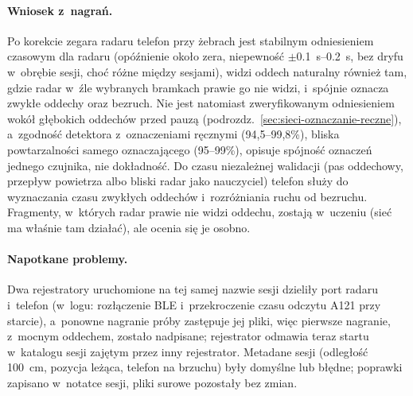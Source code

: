\documentclass[12pt,a4paper,oneside]{report}
\begin{document}
\paragraph{Wniosek z~nagrań.} Po korekcie zegara radaru telefon przy żebrach jest stabilnym odniesieniem
czasowym dla radaru (opóźnienie około zera, niepewność $\pm$\SI{0.1}{s}--\SI{0.2}{s}, bez dryfu w~obrębie
sesji, choć różne między sesjami), widzi oddech naturalny również tam, gdzie radar w~źle wybranych bramkach prawie go nie widzi,
i~spójnie oznacza zwykłe oddechy oraz bezruch. Nie jest natomiast zweryfikowanym odniesieniem wokół głębokich
oddechów przed pauzą (podrozdz.~\ref{sec:sieci-oznaczanie-reczne}), a~zgodność detektora z~oznaczeniami
ręcznymi (94,5--99,8\%), bliska powtarzalności samego oznaczającego (95--99\%), opisuje spójność oznaczeń jednego
czujnika, nie dokładność. Do czasu niezależnej
walidacji (pas oddechowy, przepływ powietrza albo bliski radar jako nauczyciel) telefon służy do wyznaczania
czasu zwykłych oddechów i~rozróżniania ruchu od bezruchu. Fragmenty, w~których radar prawie nie widzi oddechu,
zostają w~uczeniu (sieć ma właśnie tam działać), ale ocenia się je osobno.

\paragraph{Napotkane problemy.} Dwa rejestratory uruchomione na tej samej
nazwie sesji dzieliły port radaru i~telefon (w~logu: rozłączenie BLE i~przekroczenie
czasu odczytu A121 przy starcie), a~ponowne nagranie próby zastępuje jej pliki,
więc pierwsze nagranie, z~mocnym oddechem, zostało nadpisane; rejestrator
odmawia teraz startu w~katalogu sesji zajętym przez inny rejestrator. Metadane
sesji (odległość \SI{100}{cm}, pozycja leżąca, telefon na brzuchu) były
domyślne lub błędne; poprawki zapisano w~notatce sesji, pliki surowe pozostały
bez zmian.
\end{document}
